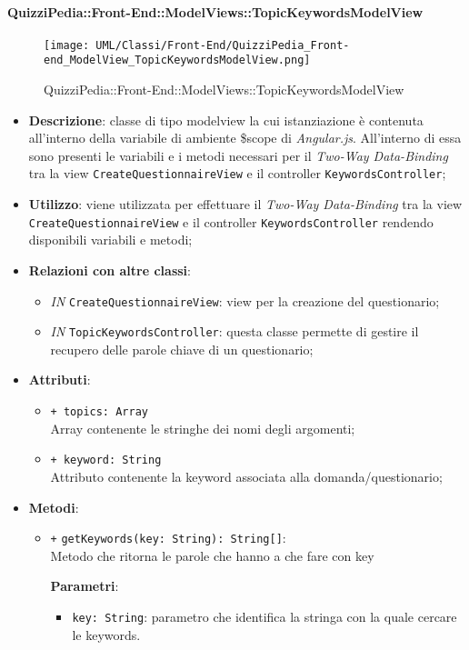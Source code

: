 \paragraph{QuizziPedia::Front-End::ModelViews::TopicKeywordsModelView}
				
				\label{QuizziPedia::Front-End::ModelViews::TopicKeywordsModelView}
				
				\begin{figure}[ht]
					\centering
					\texttt{[image: UML/Classi/Front-End/QuizziPedia\_Front-end\_ModelView\_TopicKeywordsModelView.png]}
					\caption{QuizziPedia::Front-End::ModelViews::TopicKeywordsModelView}
				\end{figure} \FloatBarrier
				
				\begin{itemize}
					\item \textbf{Descrizione}: classe di tipo modelview la cui istanziazione è contenuta all'interno della variabile di ambiente \$scope di \textit{Angular.js}. All'interno di essa sono presenti le variabili e i metodi necessari per il \textit{Two-Way Data-Binding} tra la view \texttt{CreateQuestionnaireView} e il controller \texttt{KeywordsController};
					\item \textbf{Utilizzo}: viene utilizzata per effettuare il \textit{Two-Way Data-Binding} tra la view \texttt{CreateQuestionnaireView} e il controller \texttt{KeywordsController} rendendo disponibili variabili e metodi;
					\item \textbf{Relazioni con altre classi}: 
					\begin{itemize}
						\item \textit{IN} \texttt{CreateQuestionnaireView}: view per la creazione del questionario; 
						\item \textit{IN} \texttt{TopicKeywordsController}: questa classe permette di gestire il recupero delle parole chiave di un questionario;
					\end{itemize}
					\item \textbf{Attributi}: 
					\begin{itemize}
						\item \texttt{+ topics: Array} \\ Array contenente le stringhe dei nomi degli argomenti;
						\item \texttt{+ keyword: String} \\ Attributo contenente la keyword associata alla domanda/questionario;
					\end{itemize}
					\item \textbf{Metodi}: 
					\begin{itemize}
						\item \texttt{+} \texttt{getKeywords(key: String): String[]}: \\ Metodo che ritorna le parole che hanno a che fare con key
						
						\textbf{Parametri}:
						\begin{itemize}
							\item \texttt{key: String}: parametro che identifica la stringa con la quale cercare le keywords. 
						\end{itemize}
					\end{itemize}
				\end{itemize}
				
					